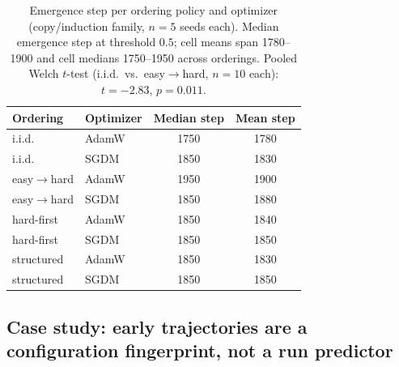 \documentclass[11pt]{article}
\theoremstyle{plain}
\theoremstyle{definition}
\begin{document}
\begin{table}[htbp]
\centering
\caption{Emergence step per ordering policy and optimizer (copy/induction family, $n=5$ seeds each).
Median emergence step at threshold $0.5$; cell means span 1780--1900 and cell medians 1750--1950 across orderings.
Pooled Welch $t$-test (i.i.d.\ vs.\ easy$\to$hard, $n=10$ each): $t=-2.83$, $p=0.011$.}
\label{tab:curriculum}
\small
\begin{tabular}{llcc}
\toprule
Ordering & Optimizer & Median step & Mean step \\
\midrule
i.i.d.\       & AdamW & 1750 & 1780 \\
i.i.d.\       & SGDM  & 1850 & 1830 \\
easy$\to$hard & AdamW & 1950 & 1900 \\
easy$\to$hard & SGDM  & 1850 & 1880 \\
hard-first    & AdamW & 1850 & 1840 \\
hard-first    & SGDM  & 1850 & 1850 \\
structured    & AdamW & 1850 & 1830 \\
structured    & SGDM  & 1850 & 1850 \\
\bottomrule
\end{tabular}
\end{table}

\subsection{Case study: early trajectories are a configuration fingerprint, not a run predictor}\label{sec:r3}
\end{document}
